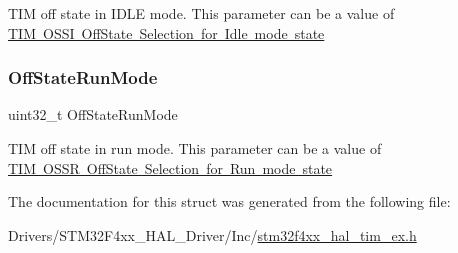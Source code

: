 T\+IM off state in I\+D\+LE mode. This parameter can be a value of \mbox{\hyperlink{group___t_i_m___o_s_s_i___off___state___selection__for___idle__mode__state}{T\+IM O\+S\+SI Off\+State Selection for Idle mode state}} \mbox{\label{struct_t_i_m___break_dead_time_config_type_def_af45695121f3b3fe1ab24e8fbdb56d781}} 
\subsubsection{\texorpdfstring{Off\+State\+Run\+Mode}{OffStateRunMode}}
{\footnotesize\ttfamily uint32\+\_\+t Off\+State\+Run\+Mode}

T\+IM off state in run mode. This parameter can be a value of \mbox{\hyperlink{group___t_i_m___o_s_s_r___off___state___selection__for___run__mode__state}{T\+IM O\+S\+SR Off\+State Selection for Run mode state}} 

The documentation for this struct was generated from the following file\+:\begin{DoxyCompactItemize}
\item 
Drivers/\+S\+T\+M32\+F4xx\+\_\+\+H\+A\+L\+\_\+\+Driver/\+Inc/\mbox{\hyperlink{stm32f4xx__hal__tim__ex_8h}{stm32f4xx\+\_\+hal\+\_\+tim\+\_\+ex.\+h}}\end{DoxyCompactItemize}
